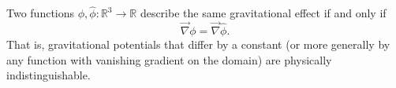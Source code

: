 Two functions $\phi, \hat{\phi}: \mathbb{R}^3 \to \mathbb{R}$ describe the same gravitational effect if and only if
$$\vec{\nabla}\phi = \vec{\nabla}\hat{\phi}.$$
That is, gravitational potentials that differ by a constant (or more generally by any function with vanishing gradient on the domain) are physically indistinguishable.
